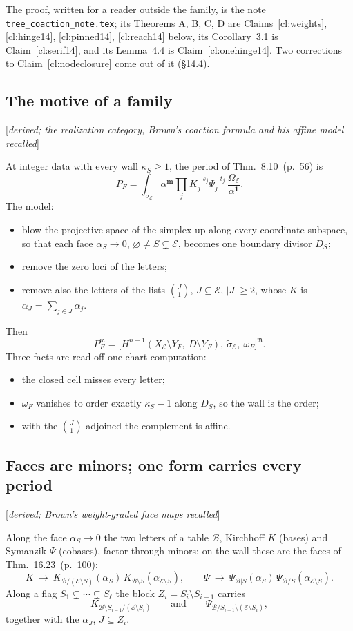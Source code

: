 \documentclass[11pt]{article}
\newcommand{\cE}{\mathcal E}
\newcommand{\cB}{\mathcal B}
\newcommand{\one}{\mathbf 1}
\newcommand{\mvec}{\mathbf m}
\newcommand{\status}[1]{\hfill{\small[\textit{#1}]}}
\newcommand{\hb}[2]{#1~(p.~#2)}   %
\theoremstyle{plain}
\theoremstyle{remark}
\begin{document}
The proof, written for a reader outside the family, is the note \texttt{tree\_coaction\_note.tex}; its Theorems A, B, C, D are Claims~\ref{cl:weights}, \ref{cl:hinge14}, \ref{cl:pinned14}, \ref{cl:reach14} below, its Corollary~3.1 is Claim~\ref{cl:serif14}, and its Lemma~4.4 is Claim~\ref{cl:onehinge14}. Two corrections to Claim~\ref{cl:nodeclosure} come out of it (\S14.4).

\subsection{The motive of a family}\status{derived; the realization category, Brown's coaction formula and his affine model recalled}

At integer data with every wall $\kappa_S\ge1$, the period of Thm.~\hb{8.10}{56} is
\[
P_F=\int_{\sigma_{\cE}}\alpha^{\mvec}\prod_jK_j^{-s_j}\Psi_j^{-t_j}\,\frac{\Omega_{\cE}}{\alpha^{\one}} .
\]
The model:
\begin{itemize}
\item blow the projective space of the simplex up along every coordinate subspace, so that each face $\alpha_S\to0$, $\varnothing\neq S\subsetneq\cE$, becomes one boundary divisor $D_S$;
\item remove the zero loci of the letters;
\item remove also the letters of the lists $\binom J1$, $J\subseteq\cE$, $|J|\ge2$, whose $K$ is $\alpha_J=\sum_{j\in J}\alpha_j$.
\end{itemize}
Then
\[
P_F^{\mathfrak m}=\big[H^{n-1}(X_{\cE}\setminus Y_F,\ D\setminus Y_F),\ \widetilde\sigma_{\cE},\ \omega_F\big]^{\mathfrak m}.
\]
Three facts are read off one chart computation:
\begin{itemize}
\item the closed cell misses every letter;
\item $\omega_F$ vanishes to order exactly $\kappa_S-1$ along $D_S$, so the wall is the order;
\item with the $\binom J1$ adjoined the complement is affine.
\end{itemize}

\subsection{Faces are minors; one form carries every period}\status{derived; Brown's weight-graded face maps recalled}

Along the face $\alpha_S\to0$ the two letters of a table $\cB$, Kirchhoff $K$ (bases) and Symanzik $\Psi$ (cobases), factor through minors; on the wall these are the faces of Thm.~\hb{16.23}{100}:
\[
K\ \to\ K_{\cB/(\cE\setminus S)}(\alpha_S)\,K_{\cB\setminus S}(\alpha_{\cE\setminus S}),\qquad \Psi\ \to\ \Psi_{\cB|S}(\alpha_S)\,\Psi_{\cB/S}(\alpha_{\cE\setminus S}).
\]
Along a flag $S_1\subsetneq\cdots\subsetneq S_\ell$ the block $Z_i=S_i\setminus S_{i-1}$ carries
\[
K_{\cB\setminus S_{i-1}/(\cE\setminus S_i)}\qquad\text{and}\qquad\Psi_{\cB/S_{i-1}\setminus(\cE\setminus S_i)},
\]
together with the $\alpha_J$, $J\subseteq Z_i$.
\end{document}
